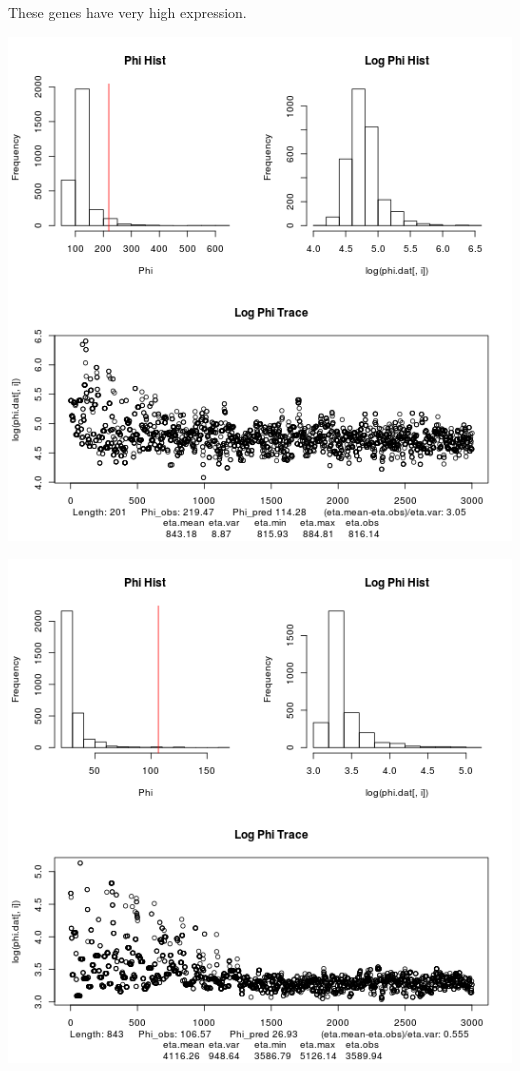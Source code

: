 \documentclass{article}
\begin{document}
 	
	These genes have very high expression.
 	
 	\includegraphics[scale=0.5]{../chosen_100/3000_steps/BIS10/reflnorm_prop/hist/100_phi_hist.png}
 	
 	\includegraphics[scale=0.5]{../chosen_100/3000_steps/BIS10/reflnorm_prop/hist/8_phi_hist.png}
 	
\end{document}
